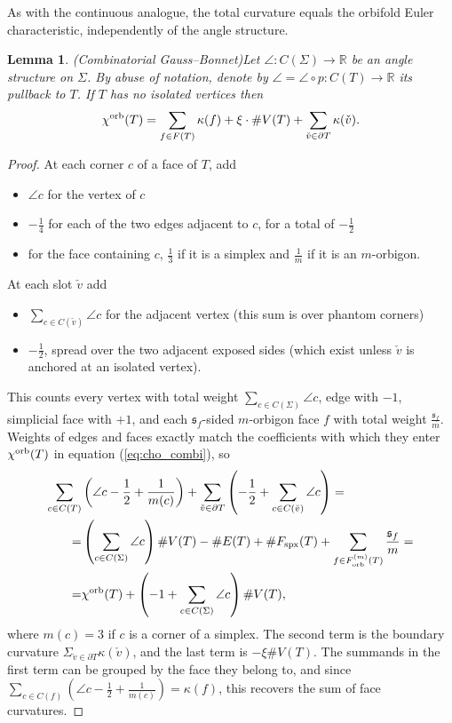 \documentclass{amsart}
\newtheorem{lemma}[conjecture]{Lemma}
\newcommand{\cho}{\chi^{\textnormal{orb}}}
\newcommand{\Fspx}{F_{\textnormal{spx}}}
\newcommand{\Forb}[1][m]{F^{(#1)}_{\textnormal{orb}}}
\begin{document}
As with the continuous analogue, the total curvature equals the orbifold Euler characteristic, independently of the angle structure.
\begin{lemma}(Combinatorial Gauss--Bonnet)\label{lmm:combi_GB}
Let $\angle\colon C(\Sigma)\to\mathbb{R}$ be an angle structure on $\Sigma$. By abuse of notation, denote by $\angle=\angle\circ p\colon C(T)\to\mathbb{R}$ its pullback to $T$. If $T$ has no isolated vertices then
\begin{equation*}
\cho(T)=\sum_{f\in F(T)}\kappa(f)+\xi\cdot\#V(T)+\sum_{\check{v}\in\partial T}\kappa(\check{v}).
\end{equation*}
\end{lemma}
\begin{proof}
At each corner $c$ of a face of $T$, add
\begin{itemize}
\item $\angle c$ for the vertex of $c$
\item $-\tfrac{1}{4}$ for each of the two edges adjacent to $c$, for a total of $-\tfrac{1}{2}$
\item for the face containing $c$, $\tfrac{1}{3}$ if it is a simplex and $\tfrac{1}{m}$ if it is an $m$-orbigon.
\end{itemize}
At each slot $\check{v}$ add
\begin{itemize}
\item $\sum_{c\in C(\check{v})}\angle c$ for the adjacent vertex (this sum is over phantom corners)
\item $-\tfrac{1}{2}$, spread over the two adjacent exposed sides (which exist unless $\check{v}$ is anchored at an isolated vertex).
\end{itemize}
This counts every vertex with total weight $\sum_{c\in C(\Sigma)}\angle c$, edge with $-1$, simplicial face with $+1$, and each $\mathfrak{s}_f$-sided $m$-orbigon face $f$ with total weight $\tfrac{\mathfrak{s}_f}{m}$. Weights of edges and faces exactly match the coefficients with which they enter $\cho(T)$ in equation (\ref{eq:cho_combi}), so
\begin{align*}
\sum_{c\in C(T)}&\left(\angle c-\frac{1}{2}+\frac{1}{m(c)}\right)+\sum_{\check{v}\in\partial T}\left(-\frac{1}{2}+\sum_{c\in C(\check{v})}\angle c\right)=\\
=&\left(\sum_{c\in C(\Sigma)}\angle c\right)\#V(T)-\#E(T)+\#\Fspx(T)+\sum_{f\in\Forb(T)}\frac{\mathfrak{s}_f}{m}=\\
=&\cho(T)+\left(-1+\sum_{c\in C(\Sigma)}\angle c\right)\#V(T),
\end{align*}
where $m(c)=3$ if $c$ is a corner of a simplex. The second term is the boundary curvature $\Sigma_{\check{v}\in\partial T}\kappa(\check{v})$, and the last term is $-\xi\#V(T)$. The summands in the first term can be grouped by the face they belong to, and since $\sum_{c\in C(f)}\left(\angle c-\tfrac{1}{2}+\tfrac{1}{m(c)}\right)=\kappa(f)$, this recovers the sum of face curvatures.
\end{proof}
\end{document}
